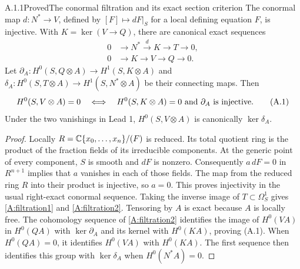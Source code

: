 \begin{statement}{A.1.1}{Proved}{The conormal filtration and its exact section criterion}
The conormal map $d:N^*\to V$, defined by $[F]\mapsto dF|_S$ for a local defining equation $F$, is injective. With $K=\ker(V\to Q)$, there are canonical exact sequences
\begin{align}
0&\longrightarrow N^*\xrightarrow{d}K\longrightarrow T\longrightarrow0,
\label{A:filtration1}\\
0&\longrightarrow K\longrightarrow V\longrightarrow Q\longrightarrow0.
\label{A:filtration2}
\end{align}
Let $\partial_A:H^0(S,Q\otimes A)\to H^1(S,K\otimes A)$ and $\delta_A:H^0(S,T\otimes A)\to H^1(S,N^*\otimes A)$ be their connecting maps. Then
\[
 H^0(S,V\otimes A)=0
 \quad\Longleftrightarrow\quad
 H^0(S,K\otimes A)=0\ \hbox{and}\ \partial_A\hbox{ is injective}.
\tag{A.1}
\]
Under the two vanishings in Lead 1, $H^0(S,V\otimes A)$ is canonically $\ker\delta_A$.
\end{statement}
\begin{proof}
Locally $R=\mathbb C\{x_0,\ldots,x_n\}/(F)$ is reduced. Its total quotient ring is the product of the fraction fields of its irreducible components. At the generic point of every component, $S$ is smooth and $dF$ is nonzero. Consequently $a\,dF=0$ in $R^{n+1}$ implies that $a$ vanishes in each of those fields. The map from the reduced ring $R$ into their product is injective, so $a=0$. This proves injectivity in the usual right-exact conormal sequence. Taking the inverse image of $T\subset\Omega_S^1$ gives \eqref{A:filtration1} and \eqref{A:filtration2}. Tensoring by $A$ is exact because $A$ is locally free. The cohomology sequence of \eqref{A:filtration2} identifies the image of $H^0(VA)$ in $H^0(QA)$ with $\ker\partial_A$ and its kernel with $H^0(KA)$, proving (A.1). When $H^0(QA)=0$, it identifies $H^0(VA)$ with $H^0(KA)$. The first sequence then identifies this group with $\ker\delta_A$ when $H^0(N^*A)=0$.
\end{proof}



